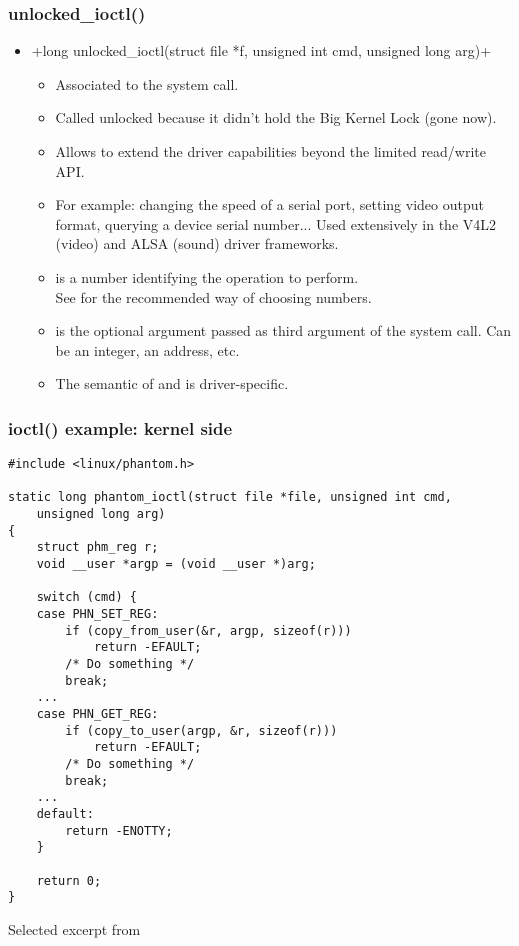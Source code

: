 \begin{frame}[fragile]
  \frametitle{unlocked\_ioctl()}
  \begin{itemize}
  \item {}+long unlocked_ioctl(struct file *f, unsigned int cmd, unsigned long arg)+
    \begin{itemize}
    \item Associated to the  system call.
    \item Called unlocked because it didn't hold the Big Kernel Lock
      (gone now).
    \item Allows to extend the driver capabilities beyond the limited
      read/write API.
    \item For example: changing the speed of a serial port, setting
      video output format, querying a device serial number... Used
      extensively in the V4L2 (video) and ALSA (sound) driver frameworks.
    \item {} is a number identifying the operation to perform.\\
      See  for the recommended way of choosing
       numbers.
    \item {} is the optional argument passed as third argument
      of the  system call. Can be an integer, an
      address, etc.
    \item The semantic of  and  is
      driver-specific.
    \end{itemize}
  \end{itemize}
\end{frame}

\begin{frame}[fragile]
  \frametitle{ioctl() example: kernel side}
\begin{verbatim}
#include <linux/phantom.h>

static long phantom_ioctl(struct file *file, unsigned int cmd,
    unsigned long arg)
{
    struct phm_reg r;
    void __user *argp = (void __user *)arg;

    switch (cmd) {
    case PHN_SET_REG:
        if (copy_from_user(&r, argp, sizeof(r)))
            return -EFAULT;
        /* Do something */
        break;
    ...
    case PHN_GET_REG:
        if (copy_to_user(argp, &r, sizeof(r)))
            return -EFAULT;
        /* Do something */
        break;
    ...
    default:
        return -ENOTTY;
    }

    return 0;
}
\end{verbatim}
\small Selected excerpt from 
\end{frame}

